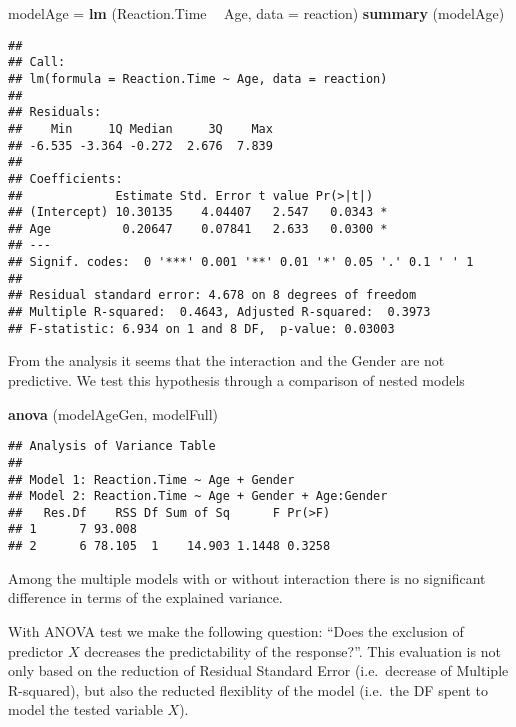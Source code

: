\documentclass[
]{article}
\newenvironment{Shaded}{\begin{snugshade}}{\end{snugshade}}
\newcommand{\DataTypeTok}[1]{\textcolor[rgb]{0.13,0.29,0.53}{#1}}
\newcommand{\KeywordTok}[1]{\textcolor[rgb]{0.13,0.29,0.53}{\textbf{#1}}}
\newcommand{\NormalTok}[1]{#1}
\newcommand{\OperatorTok}[1]{\textcolor[rgb]{0.81,0.36,0.00}{\textbf{#1}}}
\newcommand{\StringTok}[1]{\textcolor[rgb]{0.31,0.60,0.02}{#1}}
\begin{document}
\begin{Shaded}
\begin{Highlighting}[]
\NormalTok{modelAge =}\StringTok{ }\KeywordTok{lm}\NormalTok{ (Reaction.Time }\OperatorTok{~}\StringTok{ }\NormalTok{Age, }\DataTypeTok{data =}\NormalTok{ reaction)}
\KeywordTok{summary}\NormalTok{ (modelAge)}
\end{Highlighting}
\end{Shaded}

\begin{verbatim}
## 
## Call:
## lm(formula = Reaction.Time ~ Age, data = reaction)
## 
## Residuals:
##    Min     1Q Median     3Q    Max 
## -6.535 -3.364 -0.272  2.676  7.839 
## 
## Coefficients:
##             Estimate Std. Error t value Pr(>|t|)  
## (Intercept) 10.30135    4.04407   2.547   0.0343 *
## Age          0.20647    0.07841   2.633   0.0300 *
## ---
## Signif. codes:  0 '***' 0.001 '**' 0.01 '*' 0.05 '.' 0.1 ' ' 1
## 
## Residual standard error: 4.678 on 8 degrees of freedom
## Multiple R-squared:  0.4643, Adjusted R-squared:  0.3973 
## F-statistic: 6.934 on 1 and 8 DF,  p-value: 0.03003
\end{verbatim}

From the analysis it seems that the interaction and the Gender are not
predictive. We test this hypothesis through a comparison of nested
models

\begin{Shaded}
\begin{Highlighting}[]
\KeywordTok{anova}\NormalTok{ (modelAgeGen, modelFull)}
\end{Highlighting}
\end{Shaded}

\begin{verbatim}
## Analysis of Variance Table
## 
## Model 1: Reaction.Time ~ Age + Gender
## Model 2: Reaction.Time ~ Age + Gender + Age:Gender
##   Res.Df    RSS Df Sum of Sq      F Pr(>F)
## 1      7 93.008                           
## 2      6 78.105  1    14.903 1.1448 0.3258
\end{verbatim}

Among the multiple models with or without interaction there is no
significant difference in terms of the explained variance.

With ANOVA test we make the following question: ``Does the exclusion of
predictor \(X\) decreases the predictability of the response?''. This
evaluation is not only based on the reduction of Residual Standard Error
(i.e.~decrease of Multiple R-squared), but also the reducted flexiblity
of the model (i.e.~the DF spent to model the tested variable \(X\)).
\end{document}
